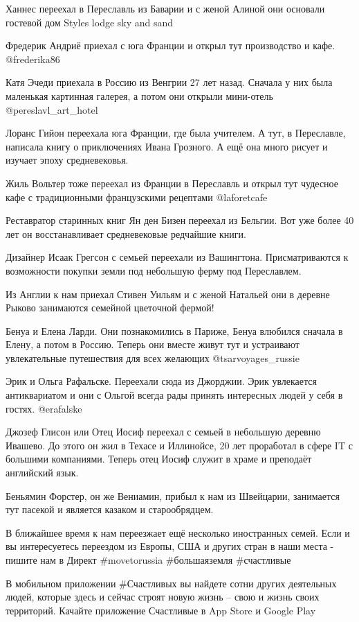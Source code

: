 Ханнес переехал в Переславль из Баварии и с женой Алиной они основали гостевой
дом Styles lodge sky and sand

Фредерик Андриё приехал с юга Франции и открыл тут производство и кафе.
@frederika86

Катя Эчеди приехала в Россию из Венгрии 27 лет назад. Сначала у них была
маленькая картинная галерея, а потом они открыли мини-отель
@pereslavl\_art\_hotel


Лоранс Гийон переехала юга Франции, где была учителем. А тут, в Переславле,
написала книгу о приключениях Ивана Грозного. А ещё она много рисует и изучает
эпоху средневековья. 

Жиль Вольтер тоже переехал из Франции в Переславль и открыл тут чудесное кафе с
традиционными французскими рецептами @laforetcafe

Реставратор старинных книг Ян ден Бизен переехал из Бельгии. Вот уже более 40
лет он восстанавливает средневековые редчайшие книги. 

Дизайнер Исаак Грегсон с семьей переехали из Вашингтона. Присматриваются к
возможности покупки земли под небольшую ферму под Переславлем.

Из Англии к нам приехал Стивен Уильям и с женой Натальей они в деревне Рыково
занимаются семейной цветочной фермой! 

Бенуа и Елена Ларди. Они познакомились в Париже, Бенуа влюбился сначала в
Елену, а потом в Россию. Теперь они вместе живут тут и устраивают увлекательные
путешествия для всех желающих @tsarvoyages\_russie

Эрик и Ольга Рафальске. Переехали сюда из Джорджии. Эрик увлекается
антиквариатом и они с Ольгой всегда рады принять интересных людей у себя в
гостях. @erafalske

Джозеф Глисон или Отец Иосиф переехал с семьей в небольшую деревню Ивашево. До
этого он жил в Техасе и Иллинойсе, 20 лет проработал в сфере IT с большими
компаниями. Теперь отец Иосиф служит в храме и преподаёт английский язык.

Беньямин Форстер, он же Вениамин, прибыл к нам из Швейцарии, занимается тут
пасекой и является казаком и старообрядцем.

В ближайшее время к нам переезжает ещё несколько иностранных семей. Если и вы
интересуетесь переездом из Европы, США  и других стран в наши места - пишите
нам в Директ \#movetorussia  \#большаяземля \#счастливые

В мобильном приложении \#Счастливых вы найдете сотни других деятельных людей,
которые здесь и сейчас строят новую жизнь – свою и  жизнь своих территорий.
Качайте приложение Счастливые в App Store и Google Play
